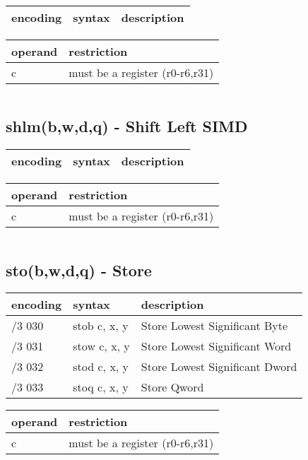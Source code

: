 \documentclass[letterpaper,10pt,openright,twoside,onecolumn]{book}
\begin{document}
  \begin{tabular}{|l|l|l|}
   \hline
    encoding & syntax & description \\
   \hline
   \hline
  \end{tabular}
  \flushleft
  \begin{tabular}{|l|l|}
   \hline
    operand & restriction \\
   \hline
    c & must be a register (r0-r6,r31) \\
   \hline
  \end{tabular}
  \begin{verbatim}
  \end{verbatim}

\newpage\subsection{shlm(b,w,d,q) - Shift Left SIMD}
  \begin{tabular}{|l|l|l|}
   \hline
    encoding & syntax & description \\
   \hline
   \hline
  \end{tabular}
  \flushleft
  \begin{tabular}{|l|l|}
   \hline
    operand & restriction \\
   \hline
    c & must be a register (r0-r6,r31) \\
   \hline
  \end{tabular}
  \begin{verbatim}
  \end{verbatim}

\newpage\subsection{sto(b,w,d,q) - Store}
  \begin{tabular}{|l|l|l|}
   \hline
    encoding & syntax & description \\
   \hline
    /3 030 & stob c, x, y & Store Lowest Significant Byte \\
    /3 031 & stow c, x, y & Store Lowest Significant Word \\
    /3 032 & stod c, x, y & Store Lowest Significant Dword \\
    /3 033 & stoq c, x, y & Store Qword \\
   \hline
  \end{tabular}

  \flushleft
  \begin{tabular}{|l|l|}
   \hline
    operand & restriction \\
   \hline
    c & must be a register (r0-r6,r31) \\
   \hline
  \end{tabular}
  \begin{verbatim}
  \end{verbatim}
\end{document}
